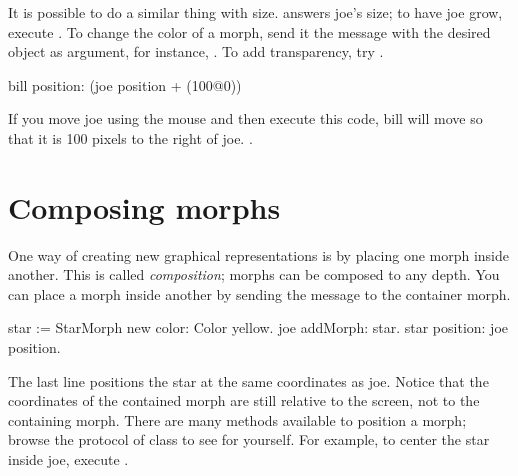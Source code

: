 \documentclass[a4paper,10pt,twoside]{book}
\begin{document}
It is possible to do a similar thing with size.
  answers joe's size; to have joe grow, execute .
To change the color of a morph, send it the  message with the desired  object as argument, for instance, .
To add transparency, try .

\begin{code}{}
bill position: (joe position + (100@0))
\end{code}
\noindent
If you move joe using the mouse and then execute this code, bill will move so that it is 100 pixels to the right of joe.
.

\section{Composing morphs}

One way of creating new graphical representations is by placing one morph inside another.
This is called \emph{composition}; morphs can be composed to any depth.
%
You can place a morph inside another by sending the message  to the container morph.

\begin{code}{}
star := StarMorph new color: Color yellow.
joe addMorph: star.
star position: joe position.
\end{code}

\noindent
The last line positions the star at the same coordinates as joe.
Notice that the coordinates of the contained morph are still relative to the screen, not to the containing morph.
There are many  methods available to position a morph; browse the  protocol of class  to see for yourself.
For example, 
to center the star inside joe, execute   .
\end{document}
